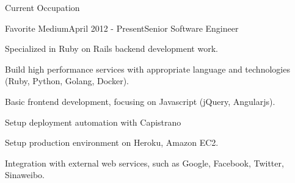 \documentclass{resume} %
\begin{document}
\begin{rSection}{Current Occupation}

\begin{rSubsection}{Favorite Medium}{April 2012 - Present}{Senior Software Engineer}{}{}
\begin{rSubsectionList}
\item Specialized in Ruby on Rails backend development work.
\item Build high performance services with appropriate language and technologies (Ruby, Python, Golang, Docker).
\item Basic frontend development, focusing on Javascript (jQuery, Angularjs).
\item Setup deployment automation with Capistrano
\item Setup production environment on Heroku, Amazon EC2.
\item Integration with external web services, such as Google, Facebook, Twitter, Sinaweibo.
\end{rSubsectionList}
\end{rSubsection}
\end{rSection}
\end{document}
